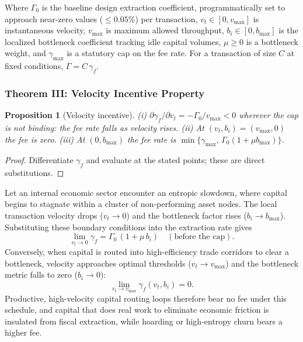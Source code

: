 \documentclass[11pt,a4paper]{article}
\theoremstyle{definition}
\theoremstyle{plain}
\newtheorem{proposition}{Proposition}
\theoremstyle{remark}
\begin{document}
Where $\Gamma_0$ is the baseline design extraction coefficient, programmatically set to approach near-zero values ($\le 0.05\%$) per transaction, $v_t \in [0, v_{\max}]$ is instantaneous velocity, $v_{\max}$ is maximum allowed throughput, $b_i \in [0, b_{\max}]$ is the localized bottleneck coefficient tracking idle capital volumes, $\mu \ge 0$ is a bottleneck weight, and $\gamma_{\max}$ is a statutory cap on the fee rate. For a transaction of size $C$ at fixed conditions, $\Gamma = C\,\gamma_f$.

\subsubsection*{Theorem III: Velocity Incentive Property}
\begin{proposition}[Velocity incentive]\label{prop:fee}
(i) $\partial \gamma_f/\partial v_t = -\Gamma_0/v_{\max} < 0$ wherever the cap is not binding: the fee rate falls as velocity rises. (ii) At $(v_t, b_i) = (v_{\max}, 0)$ the fee is zero. (iii) At $(0, b_{\max})$ the fee rate is $\min\{\gamma_{\max},\, \Gamma_0(1 + \mu b_{\max})\}$.
\end{proposition}
\begin{proof}
Differentiate $\gamma_f$ and evaluate at the stated points; these are direct substitutions. \qedhere
\end{proof}

Let an internal economic sector encounter an entropic slowdown, where capital begins to stagnate within a cluster of non-performing asset nodes. The local transaction velocity drops ($v_t \to 0$) and the bottleneck factor rises ($b_i \to b_{\max}$). Substituting these boundary conditions into the extraction rate gives
\begin{equation}
\lim_{v_t \to 0} \gamma_f = \Gamma_0\,(1 + \mu\, b_i) \quad (\text{before the cap}).
\end{equation}
Conversely, when capital is routed into high-efficiency trade corridors to clear a bottleneck, velocity approaches optimal thresholds ($v_t \to v_{\max}$) and the bottleneck metric falls to zero ($b_i \to 0$):
\begin{equation}
\lim_{v_t \to v_{\max}} \gamma_f(v_t, b_i) = 0 .
\end{equation}
Productive, high-velocity capital routing loops therefore bear no fee under this schedule, and capital that does real work to eliminate economic friction is insulated from fiscal extraction, while hoarding or high-entropy churn bears a higher fee.
\end{document}
